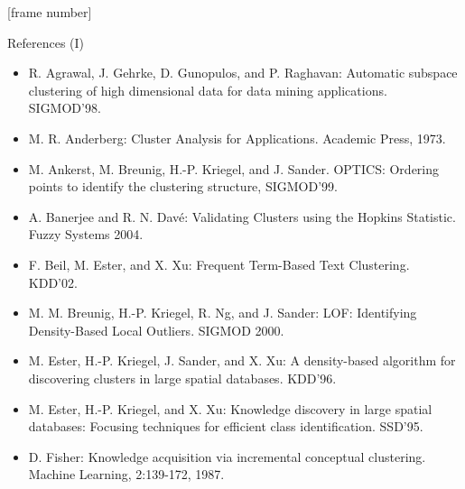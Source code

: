 \documentclass[aspectratio=169,t,xcolor=dvipsnames]{beamer}
\begin{document}
  {
    [frame number]
    \begin{frame}{References (I)}
        \begin{itemize}
          \item R. Agrawal, J. Gehrke, D. Gunopulos, and P. Raghavan: Automatic subspace clustering of high dimensional data for data mining applications. SIGMOD'98.
          \item M. R. Anderberg: Cluster Analysis for Applications. Academic Press, 1973.
          \item M. Ankerst, M. Breunig, H.-P. Kriegel, and J. Sander. OPTICS: Ordering points to identify the clustering structure, SIGMOD'99.
          \item A. Banerjee and R. N. Davé: Validating Clusters using the Hopkins Statistic. Fuzzy Systems 2004.
          \item F. Beil, M. Ester, and X. Xu: Frequent Term-Based Text Clustering. KDD'02.
          \item M. M. Breunig, H.-P. Kriegel, R. Ng, and J. Sander: LOF: Identifying Density-Based Local Outliers. SIGMOD 2000.
          \item M. Ester, H.-P. Kriegel, J. Sander, and X. Xu: A density-based algorithm for discovering clusters in large spatial databases. KDD'96.
          \item M. Ester, H.-P. Kriegel, and X. Xu: Knowledge discovery in large spatial databases: Focusing techniques for efficient class identification. SSD'95.
          \item D. Fisher: Knowledge acquisition via incremental conceptual clustering. Machine Learning, 2:139-172, 1987.
        \end{itemize}
    \end{frame}
  }
\end{document}
